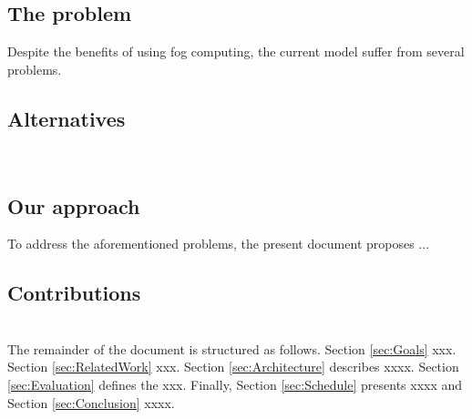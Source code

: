 \subsection{The problem}
\noindent\tab Despite the benefits of using fog computing, the current model suffer from several problems. \cite{Armbrust:10} \\

\subsection{Alternatives}
\noindent\tab [Alternatives]\\

\subsection{Our approach}
\noindent\tab To address the aforementioned problems, the present document proposes ...\\

\subsection{Contributions}
\noindent\tab [Contributions]\\
\noindent\tab The remainder of the document is structured as follows. Section \ref{sec:Goals} xxx. Section \ref{sec:RelatedWork} xxx. Section \ref{sec:Architecture} describes xxxx. Section \ref{sec:Evaluation} defines the xxx. Finally, Section \ref{sec:Schedule} presents xxxx and Section \ref{sec:Conclusion} xxxx.


